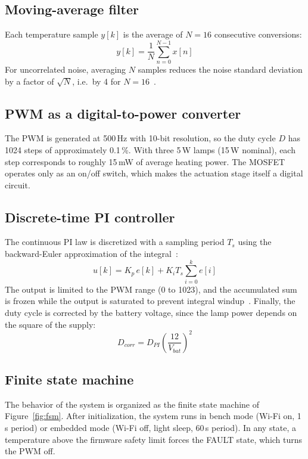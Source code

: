 \subsection{Moving-average filter}
Each temperature sample $y[k]$ is the average of $N = 16$ consecutive conversions:
\begin{equation}
  y[k] = \frac{1}{N}\sum_{n=0}^{N-1} x[n]
  \label{eq:ma}
\end{equation}
For uncorrelated noise, averaging $N$ samples reduces the noise standard deviation by a factor of
$\sqrt{N}$, i.e.\ by 4 for $N=16$~\cite{oppenheim2010}.

\subsection{PWM as a digital-to-power converter}
The PWM is generated at 500\,Hz with 10-bit resolution, so the duty cycle $D$ has 1024 steps of
approximately 0.1\,\%. With three 5\,W lamps (15\,W nominal), each step corresponds to roughly
15\,mW of average heating power. The MOSFET operates only as an on/off switch, which makes the
actuation stage itself a digital circuit.

\subsection{Discrete-time PI controller}
The continuous PI law is discretized with a sampling period $T_s$ using the backward-Euler
approximation of the integral~\cite{franklin1998}:
\begin{equation}
  u[k] = K_p\,e[k] + K_i T_s \sum_{i=0}^{k} e[i]
  \label{eq:dpi}
\end{equation}
The output is limited to the PWM range (0 to 1023), and the accumulated sum is frozen while the
output is saturated to prevent integral windup~\cite{astrom1995}. Finally, the duty cycle is
corrected by the battery voltage, since the lamp power depends on the square of the supply:
\begin{equation}
  D_{corr} = D_{PI}\left(\frac{12}{V_{bat}}\right)^{2}
  \label{eq:comp}
\end{equation}

\subsection{Finite state machine}
The behavior of the system is organized as the finite state machine of Figure~\ref{fig:fsm}. After
initialization, the system runs in bench mode (Wi-Fi on, 1\,s period) or embedded mode (Wi-Fi off,
light sleep, 60\,s period). In any state, a temperature above the firmware safety limit forces the
FAULT state, which turns the PWM off. 

